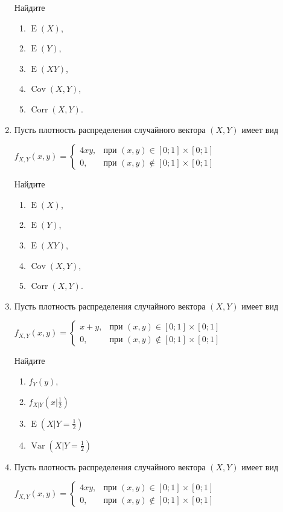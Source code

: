 \documentclass[12pt]{article}
\DeclareMathOperator{\Cov}{Cov}
\DeclareMathOperator{\Corr}{Corr}
\DeclareMathOperator{\Var}{Var}
\DeclareMathOperator{\E}{E}
\begin{document}
\begin{enumerate}
Найдите
\begin{enumerate}
\item $\E(X)$,
\item $\E(Y)$,
\item $\E(XY)$,
\item $\Cov(X,Y)$,
\item $\Corr(X,Y)$.
\end{enumerate}

\item Пусть плотность распределения случайного вектора $(X,Y)$ имеет вид
\begin{center} $f_{X,Y}(x,y) = \begin{cases} 4xy, & \text{при } (x,y) \in [0;1] \times [0;1] \\ 0 , & \text{при } (x,y) \not\in [0;1] \times [0;1] \end{cases}$  \end{center}

Найдите
\begin{enumerate}
\item $\E(X)$,
\item $\E(Y)$,
\item $\E(XY)$,
\item $\Cov(X,Y)$,
\item $\Corr(X,Y)$.
\end{enumerate}

\item Пусть плотность распределения случайного вектора $(X,Y)$ имеет вид
\begin{center} $f_{X,Y}(x,y) = \begin{cases} x+y, & \text{при } (x,y) \in [0;1] \times [0;1] \\ 0 , & \text{при } (x,y) \not\in [0;1] \times [0;1] \end{cases}$  \end{center}

Найдите
\begin{enumerate}
\item $f_{Y}(y)$,
\item $f_{X|Y}\left(x|\frac{1}{2}\right)$
\item $\E\left(X|Y = \frac{1}{2}\right)$
\item $\Var\left(X|Y = \frac{1}{2}\right)$
\end{enumerate}

\item Пусть плотность распределения случайного вектора $(X,Y)$ имеет вид
\begin{center} $f_{X,Y}(x,y) = \begin{cases} 4xy, & \text{при } (x,y) \in [0;1] \times [0;1] \\ 0 , & \text{при } (x,y) \not\in [0;1] \times [0;1] \end{cases}$  \end{center}


\end{enumerate}
\end{document}
